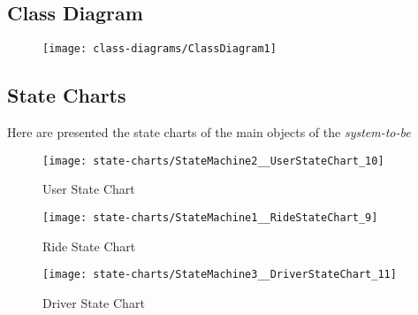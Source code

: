 \subsection{Class Diagram} 
\begin{figure}[h!t]
\texttt{[image: class-diagrams/ClassDiagram1]}
\centering
\end{figure}
\newpage

\subsection{State Charts} 
Here are presented the state charts of the main objects of the \emph{system-to-be}

\begin{figure}[h!]
\caption{User State Chart}
\texttt{[image: state-charts/StateMachine2\_\_UserStateChart\_10]}
\centering
\end{figure}

\newpage
\vfill
\begin{figure}
\caption{Ride State Chart}
\texttt{[image: state-charts/StateMachine1\_\_RideStateChart\_9]}
\centering
\end{figure}
\vfill
\clearpage


\newpage
\vfill
\begin{figure}
\caption{Driver State Chart}
\texttt{[image: state-charts/StateMachine3\_\_DriverStateChart\_11]}
\centering
\end{figure}
\vfill
\clearpage
